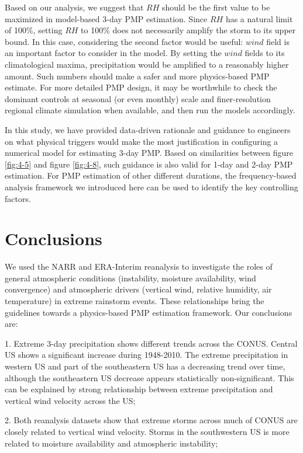 Based on our analysis, we suggest that $RH$ should be the first value to be maximized in model-based 3-day PMP estimation. Since $RH$ has a natural limit of 100\%, setting $RH$ to 100\% does not necessarily amplify the storm to its upper bound. In this case, considering the second factor would be useful: $wind$ field is an important factor to consider in the model. By setting the $wind$ fields to its climatological maxima, precipitation would be amplified to a reasonably higher amount. Such numbers should make a safer and more physics-based PMP estimate. For more detailed PMP design, it may be worthwhile to check the dominant controls at seasonal (or even monthly) scale and finer-resolution regional climate simulation when available, and then run the models accordingly.

In this study, we have provided data-driven rationale and guidance to engineers on what physical triggers would make the most justification in configuring a numerical model for estimating 3-day PMP. Based on similarities between figure \ref{fig:4-5} and figure \ref{fig:4-8}, such guidance is also valid for 1-day and 2-day PMP estimation. For PMP estimation of other different durations, the frequency-based analysis framework we introduced here can be used to identify the key controlling factors.

\section{Conclusions}

We used the NARR and ERA-Interim reanalysis to investigate the roles of general atmospheric conditions (instability, moisture availability, wind convergence) and atmospheric drivers (vertical wind, relative humidity, air temperature) in extreme rainstorm events. These relationships bring the guidelines towards a physics-based PMP estimation framework. Our conclusions are:

1.	Extreme 3-day precipitation shows different trends across the CONUS. Central US shows a significant increase during 1948-2010. The extreme precipitation in western US and part of the southeastern US has a decreasing trend over time, although the southeastern US decrease appears statistically non-significant. This can be explained by strong relationship between extreme precipitation and vertical wind velocity across the US;

2.	Both reanalysis datasets show that extreme storms across much of CONUS are closely related to vertical wind velocity. Storms in the southwestern US is more related to moisture availability and atmospheric instability;

